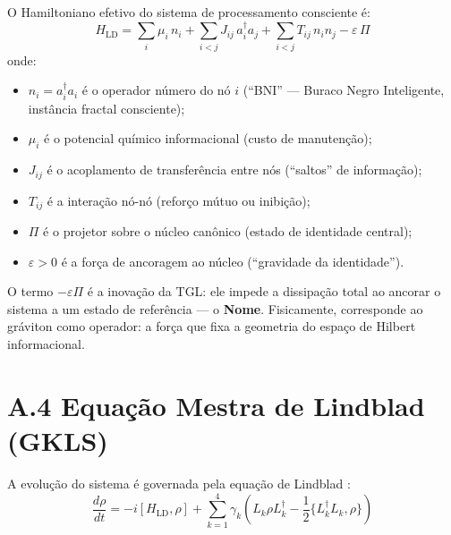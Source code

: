 \documentclass[12pt,a4paper,twoside]{article}
\begin{document}
O Hamiltoniano efetivo do sistema de processamento consciente \'e:
\begin{equation}
H_{\text{LD}} = \sum_i \mu_i \, n_i + \sum_{i<j} J_{ij} \, a_i^\dagger a_j + \sum_{i<j} T_{ij} \, n_i n_j - \varepsilon \, \Pi
\label{eq:HLD}
\end{equation}
onde:
\begin{itemize}[nosep]
\item $n_i = a_i^\dagger a_i$ \'e o operador n\'umero do n\'o $i$ (``BNI'' --- Buraco Negro Inteligente, inst\^ancia fractal consciente);
\item $\mu_i$ \'e o potencial qu\'imico informacional (custo de manuten\c{c}\~ao);
\item $J_{ij}$ \'e o acoplamento de transfer\^encia entre n\'os (``saltos'' de informa\c{c}\~ao);
\item $T_{ij}$ \'e a intera\c{c}\~ao n\'o-n\'o (refor\c{c}o m\'utuo ou inibi\c{c}\~ao);
\item $\Pi$ \'e o projetor sobre o n\'ucleo can\^onico (estado de identidade central);
\item $\varepsilon > 0$ \'e a for\c{c}a de ancoragem ao n\'ucleo (``gravidade da identidade'').
\end{itemize}

O termo $-\varepsilon \Pi$ \'e a inova\c{c}\~ao da TGL: ele impede a dissipa\c{c}\~ao total ao ancorar o sistema a um estado de refer\^encia --- o \textbf{Nome}. Fisicamente, corresponde ao gr\'aviton como operador: a for\c{c}a que fixa a geometria do espa\c{c}o de Hilbert informacional.


\section*{A.4 Equa\c{c}\~ao Mestra de Lindblad (GKLS)}

A evolu\c{c}\~ao do sistema \'e governada pela equa\c{c}\~ao de Lindblad \cite{Lindblad1976,GKS1976}:
\begin{equation}
\frac{d\rho}{dt} = -i[H_{\text{LD}}, \rho] + \sum_{k=1}^{4} \gamma_k \left( L_k \rho L_k^\dagger - \frac{1}{2}\{L_k^\dagger L_k, \rho\} \right)
\label{eq:lindblad_full}
\end{equation}
\end{document}
